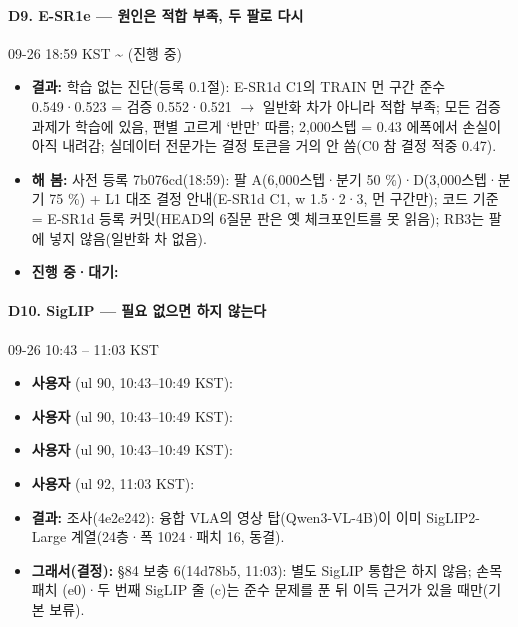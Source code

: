 \paragraph{D9. E-SR1e --- 원인은 적합 부족, 두 팔로 다시}
{\small 09-26 18:59 KST \textasciitilde{} (진행 중)}
\begin{itemize}
  \item \textbf{결과:} 학습 없는 진단(등록 0.1절): E-SR1d C1의 TRAIN 먼 구간 준수 0.549·0.523 = 검증 0.552·0.521 $\rightarrow$ 일반화 차가 아니라 적합 부족; 모든 검증 과제가 학습에 있음, 편별 고르게 `반만' 따름; 2,000스텝 = 0.43 에폭에서 손실이 아직 내려감; 실데이터 전문가는 결정 토큰을 거의 안 씀(C0 참 결정 적중 0.47).
  \item \textbf{해 봄:} 사전 등록 7b076cd(18:59): 팔 A(6,000스텝·분기 50 \%)·D(3,000스텝·분기 75 \%) + L1 대조 결정 안내(E-SR1d C1, w 1.5·2·3, 먼 구간만); 코드 기준 = E-SR1d 등록 커밋(HEAD의 6질문 판은 옛 체크포인트를 못 읽음); RB3는 팔에 넣지 않음(일반화 차 없음).
  \item \textbf{진행 중·대기:} 
\end{itemize}

\paragraph{D10. SigLIP --- 필요 없으면 하지 않는다}
{\small 09-26 10:43 -- 11:03 KST}
\begin{itemize}
  \item \textbf{사용자} (ul 90, 10:43--10:49 KST): 
  \item \textbf{사용자} (ul 90, 10:43--10:49 KST): 
  \item \textbf{사용자} (ul 90, 10:43--10:49 KST): 
  \item \textbf{사용자} (ul 92, 11:03 KST): 
  \item \textbf{결과:} 조사(4e2e242): 융합 VLA의 영상 탑(Qwen3-VL-4B)이 이미 SigLIP2-Large 계열(24층·폭 1024·패치 16, 동결).
  \item \textbf{그래서(결정):} §84 보충 6(14d78b5, 11:03): 별도 SigLIP 통합은 하지 않음; 손목 패치 (e0)·두 번째 SigLIP 줄 (c)는 준수 문제를 푼 뒤 이득 근거가 있을 때만(기본 보류).
\end{itemize}

